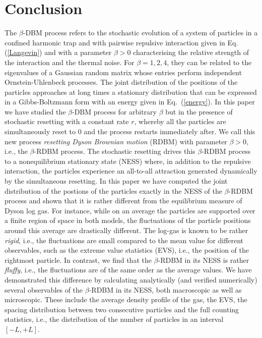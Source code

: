 \documentclass[onecolumn,superscriptaddress,
 amsmath,amssymb,
 aps,
 prd,
]{revtex4-1}
\begin{document}
\section{Conclusion} \label{sec:conclusion}

The $\beta$-DBM process refers to the stochastic evolution of a system of particles in a confined harmonic trap and with pairwise repulsive
interaction given in Eq. (\ref{Langevin}) and with a parameter $\beta>0$ characterising the relative strength of the interaction and the thermal noise. 
For $\beta = 1,2,4$, they can be related to the eigenvalues of a Gaussian random matrix whose entries perform independent Ornstein-Uhlenbeck processes.  
The joint distribution of the positions of the particles approaches at long times a stationary distribution that can be 
expressed in a Gibbs-Boltzmann form with an energy given in Eq.~(\ref{energy}). In this paper we have studied the $\beta$-DBM process for arbitrary $\beta$ but in the presence of stochastic resetting with a constant rate $r$, whereby
all the particles are simultaneously reset to $0$ and the process restarts immediately after. We call this new process {\it resetting Dyson Brownian motion} (RDBM) with parameter $\beta > 0$, i.e., the $\beta$-RDBM process. The stochastic resetting drives this $\beta$-RDBM process to a nonequilibrium stationary state (NESS) where, in addition to the repulsive interaction, the particles experience an all-to-all attraction generated dynamically by the simultaneous resetting. In this paper we have computed the joint distribution of the postions of the particles exactly in the NESS of the $\beta$-RDBM process and shown that it is rather different from the equilibrium measure of Dyson log gas. For instance, while on an average the particles are supported over a finite region of space in both models,
the fluctuations of the particle positions around this average are drastically different. The log-gas is known to be rather {\it rigid}, i.e., the fluctuations are small compared to the mean value for different observables, such as the extreme value statistics (EVS), i.e., the position of the rightmost particle. In contrast, we find that the $\beta$-RDBM in its NESS is rather {\it fluffy}, i.e., the fluctuations are of the same order as the average values. We have demonstrated this difference by calculating analytically (and verified numerically) several observables of the $\beta$-RDBM in its NESS, both macroscopic as well as microscopic. These include the average density profile of the gas, the EVS, the spacing distribution between two consecutive particles and the full counting statistics, i.e., the distribution of the number of particles in an interval $[-L,+L]$. 
 
\end{document}
